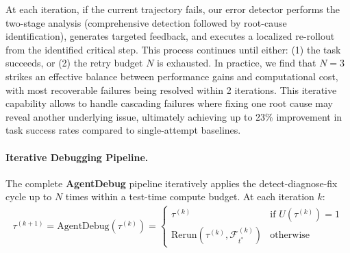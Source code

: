 At each iteration, if the current trajectory fails, our error detector performs the two-stage analysis (comprehensive detection followed by root-cause identification), generates targeted feedback, and executes a localized re-rollout from the identified critical step. This process continues until either: (1) the task succeeds, or (2) the retry budget $N$ is exhausted. In practice, we find that $N=3$ strikes an effective balance between performance gains and computational cost, with most recoverable failures being resolved within 2 iterations. This iterative capability allows \ModelName{} to handle cascading failures where fixing one root cause may reveal another underlying issue, ultimately achieving up to 23\% improvement in task success rates compared to single-attempt baselines.


\paragraph{Iterative Debugging Pipeline.}
The complete \textbf{AgentDebug} pipeline iteratively applies the detect-diagnose-fix cycle up to $N$ times within a test-time compute budget. At each iteration $k$:
\begin{align}
\tau^{(k+1)} = \text{AgentDebug}(\tau^{(k)}) = \begin{cases}
\tau^{(k)} & \text{if } U(\tau^{(k)}) = 1 \\
\text{Rerun}(\tau^{(k)}, \mathcal{F}_{t^*}^{(k)}) & \text{otherwise}
\end{cases}
\end{align}
